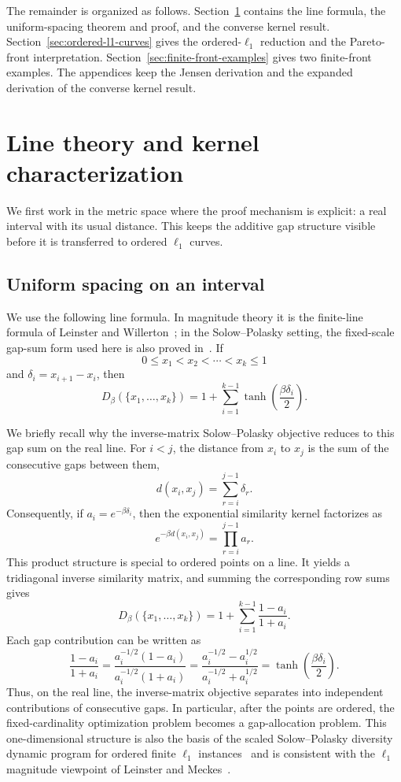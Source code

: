 \documentclass[12pt,a4paper]{article}
\begin{document}
The remainder is organized as follows.  Section~\ref{sec:line-theory} contains the line formula, the uniform-spacing theorem and proof, and the converse kernel result.  Section~\ref{sec:ordered-l1-curves} gives the ordered-$\ell_1$ reduction and the Pareto-front interpretation.  Section~\ref{sec:finite-front-examples} gives two finite-front examples.  The appendices keep the Jensen derivation and the expanded derivation of the converse kernel result.

\section{Line theory and kernel characterization}
\label{sec:line-theory}

We first work in the metric space where the proof mechanism is explicit: a real interval with its usual distance.  This keeps the additive gap structure visible before it is transferred to ordered $\ell_1$ curves.

\subsection{Uniform spacing on an interval}
\label{sec:unit-line-theory}

We use the following line formula.  In magnitude theory it is the finite-line formula of Leinster and Willerton~\cite{LeinsterWillerton2009}; in the Solow--Polasky setting, the fixed-scale gap-sum form used here is also proved in~\cite{Emmerich2026PolynomialTime}.  If
\[
 0 \leq x_1 < x_2 < \cdots < x_k \leq 1
\]
and $\delta_i=x_{i+1}-x_i$, then
\begin{equation}
\label{eq:line-formula}
D_\beta(\{x_1,\ldots,x_k\})
 = 1 + \sum_{i=1}^{k-1} \tanh\!\left(\frac{\beta\delta_i}{2}\right).
\end{equation}


We briefly recall why the inverse-matrix Solow--Polasky objective reduces to this gap sum on the real line.  For $i<j$, the distance from $x_i$ to $x_j$ is the sum of the consecutive gaps between them,
\[
 d(x_i,x_j)=\sum_{r=i}^{j-1}\delta_r .
\]
Consequently, if $a_i=e^{-\beta\delta_i}$, then the exponential similarity kernel factorizes as
\[
 e^{-\beta d(x_i,x_j)}
 = \prod_{r=i}^{j-1} a_r .
\]
This product structure is special to ordered points on a line.  It yields a tridiagonal inverse similarity matrix, and summing the corresponding row sums gives
\[
D_\beta(\{x_1,\ldots,x_k\})
=
1+\sum_{i=1}^{k-1}\frac{1-a_i}{1+a_i}.
\]
Each gap contribution can be written as
\[
\frac{1-a_i}{1+a_i}
=
\frac{a_i^{-1/2}(1-a_i)}{a_i^{-1/2}(1+a_i)}
=
\frac{a_i^{-1/2}-a_i^{1/2}}
 {a_i^{-1/2}+a_i^{1/2}}
=
\tanh\!\left(\frac{\beta\delta_i}{2}\right).
\]
Thus, on the real line, the inverse-matrix objective separates into independent contributions of consecutive gaps.  In particular, after the points are ordered, the fixed-cardinality optimization problem becomes a gap-allocation problem.  This one-dimensional structure is also the basis of the scaled Solow--Polasky diversity dynamic program for ordered finite $\ell_1$ instances~\cite{Emmerich2026PolynomialTime} and is consistent with the $\ell_1$ magnitude viewpoint of Leinster and Meckes~\cite{LeinsterMeckes2017}.
\end{document}
